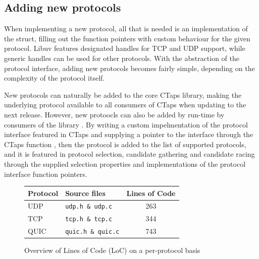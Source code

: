\subsection{Adding new protocols} \label{sec:addingNewProtocols}

When implementing a new protocol, all that is needed is an
implementation of the struct, filling out the function pointers
with custom behaviour for the given protocol. Libuv features
designated handles for TCP and UDP support, while generic
handles can be used for other protocols. 
With the abstraction of the protocol interface, adding new protocols
becomes fairly simple, depending on the complexity of the protocol
itself.

New protocols can naturally be added to the core CTaps library,
making the underlying protocol available to all consumers of CTaps
when updating to the next release. However, new protoocls can also
be added by run-time by consumers of the library .
By writing a custom impelmentation of the protocol interface featured
in CTaps and supplying a pointer to the interface through the CTaps
function , then the protocol is added
to the list of supported protocols, and it is featured in protocol
selection, candidate gathering and candidate racing through the supplied
selection properties and implementations of the protocol interface function
pointers.

\begin{figure}[H]
\begin{center}
\begin{tabular}{ ||l|l|c| } 
 \hline
 \textbf{Protocol}   & \textbf{Source files}             & \textbf{Lines of Code} \\ 
 \hline \hline
 UDP                 & \texttt{udp.h \& udp.c}                    & 263 \\ 
 \hline
 TCP                 & \texttt{tcp.h \& tcp.c}                    & 344 \\ 
 \hline
 QUIC                & \texttt{quic.h \& quic.c}                  & 743 \\
 \hline
\end{tabular}
\end{center}
\caption{Overview of Lines of Code (LoC) on a per-protocol basis}
\label{fig:protocolLoc}
\end{figure} 
